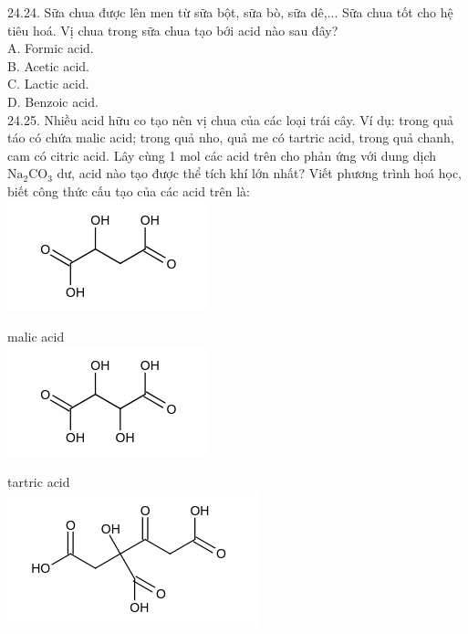 \documentclass[10pt]{article}
\begin{document}
24.24. Sữa chua được lên men từ sữa bột, sữa bò, sữa dê,... Sữa chua tốt cho hệ tiêu hoá. Vị chua trong sữa chua tạo bới acid nào sau đây?\\
A. Formic acid.\\
B. Acetic acid.\\
C. Lactic acid.\\
D. Benzoic acid.\\
24.25. Nhiều acid hữu co tạo nên vị chua của các loại trái cây. Ví dụ: trong quả táo có chứa malic acid; trong quả nho, quả me có tartric acid, trong quả chanh, cam có citric acid. Lây cùng 1 mol các acid trên cho phản ứng với dung dịch $\mathrm{Na}_{2} \mathrm{CO}_{3}$ dư, acid nào tạo được thể tích khí lớn nhất? Viết phương trình hoá học, biết công thức cấu tạo của các acid trên là:\\
\includegraphics{smile-2d1e54571db04b8a051b4753e075d9a266b61e57}

malic acid\\
\includegraphics{smile-e059a58a7b7fdef3b2ba3d90d68450c3e9d8f569}

tartric acid\\
\includegraphics{smile-ef9ea39b736b29b5cc922a7675095baef1b55db2}
\end{document}
